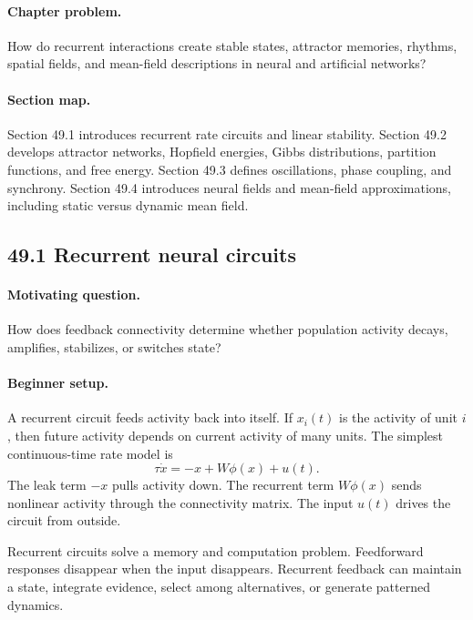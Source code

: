 \paragraph{Chapter problem.}
How do recurrent interactions create stable states, attractor memories, rhythms, spatial fields, and mean-field descriptions in neural and artificial networks?

\paragraph{Section map.}
Section 49.1 introduces recurrent rate circuits and linear stability. Section 49.2 develops attractor networks, Hopfield energies, Gibbs distributions, partition functions, and free energy. Section 49.3 defines oscillations, phase coupling, and synchrony. Section 49.4 introduces neural fields and mean-field approximations, including static versus dynamic mean field.

\subsection{49.1 Recurrent neural circuits}

\paragraph{Motivating question.}
How does feedback connectivity determine whether population activity decays, amplifies, stabilizes, or switches state?

\paragraph{Beginner setup.}
A recurrent circuit feeds activity back into itself. If \(x_i(t)\) is the activity of unit \(i\), then future activity depends on current activity of many units. The simplest continuous-time rate model is
\[
\tau \dot x=-x+W\phi(x)+u(t).
\]
The leak term \(-x\) pulls activity down. The recurrent term \(W\phi(x)\) sends nonlinear activity through the connectivity matrix. The input \(u(t)\) drives the circuit from outside.

Recurrent circuits solve a memory and computation problem. Feedforward responses disappear when the input disappears. Recurrent feedback can maintain a state, integrate evidence, select among alternatives, or generate patterned dynamics.

